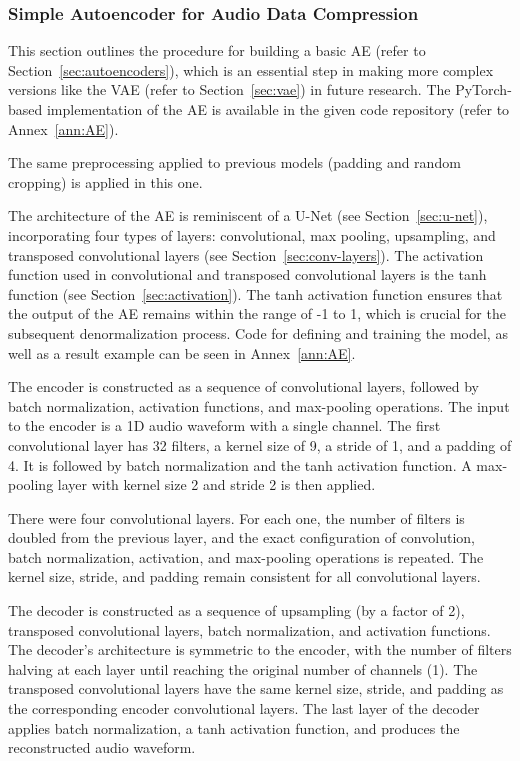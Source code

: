 \subsubsection{Simple Autoencoder for Audio Data Compression}

This section outlines the procedure for building a basic \ac{AE} (refer to Section~\ref{sec:autoencoders}), which is an essential step in making more complex versions like the \ac{VAE} (refer to Section~\ref{sec:vae}) in future research. The PyTorch-based implementation of the \ac{AE} is available in the given code repository (refer to Annex~\ref{ann:AE}).

The same preprocessing applied to previous models (padding and random cropping) is applied in this one.

The architecture of the \ac{AE} is reminiscent of a U-Net (see Section~\ref{sec:u-net}), incorporating four types of layers: convolutional, max pooling, upsampling, and transposed convolutional layers (see Section~\ref{sec:conv-layers}). The activation function used in convolutional and transposed convolutional layers is the \ac{tanh} function (see Section~\ref{sec:activation}). The \ac{tanh} activation function ensures that the output of the \ac{AE} remains within the range of -1 to 1, which is crucial for the subsequent denormalization process. Code for defining and training the model, as well as a result example can be seen in Annex~\ref{ann:AE}.

The encoder is constructed as a sequence of convolutional layers, followed by batch normalization, activation functions, and max-pooling operations. The input to the encoder is a 1D audio waveform with a single channel. The first convolutional layer has 32 filters, a kernel size of 9, a stride of 1, and a padding of 4. It is followed by batch normalization and the \ac{tanh} activation function. A max-pooling layer with kernel size 2 and stride 2 is then applied. 

There were four convolutional layers. For each one, the number of filters is doubled from the previous layer, and the exact configuration of convolution, batch normalization, activation, and max-pooling operations is repeated. The kernel size, stride, and padding remain consistent for all convolutional layers.

The decoder is constructed as a sequence of upsampling (by a factor of 2), transposed convolutional layers, batch normalization, and activation functions. The decoder's architecture is symmetric to the encoder, with the number of filters halving at each layer until reaching the original number of channels (1). The transposed convolutional layers have the same kernel size, stride, and padding as the corresponding encoder convolutional layers. The last layer of the decoder applies batch normalization, a \ac{tanh} activation function, and produces the reconstructed audio waveform.


